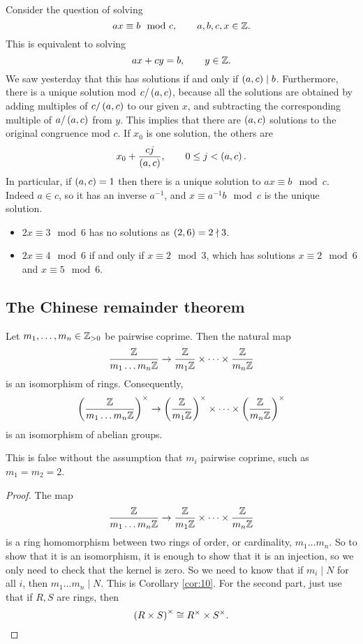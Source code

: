 Consider the question of solving
$$ ax \equiv b \mod c, \qquad a, b, c, x \in \mathbb{Z}. $$
This is equivalent to solving
$$ ax + cy = b, \qquad y \in \mathbb{Z}. $$
We saw yesterday that this has solutions if and only if $ \left( a, c \right) \mid b $. Furthermore, there is a unique solution mod $ c / \left( a, c \right) $, because all the solutions are obtained by adding multiples of $ c / \left( a, c \right) $ to our given $ x $, and subtracting the corresponding multiple of $ a / \left( a, c \right) $ from $ y $. This implies that there are $ \left( a, c \right) $ solutions to the original congruence mod $ c $. If $ x_0 $ is one solution, the others are
$$ x_0 + \dfrac{cj}{\left( a, c \right)}, \qquad 0 \le j < \left( a, c \right). $$
In particular, if $ \left( a, c \right) = 1 $ then there is a unique solution to $ ax \equiv b \mod c $. Indeed $ a \in \unit{c} $, so it has an inverse $ a^{-1} $, and $ x \equiv a^{-1}b \mod c $ is the unique solution.

\begin{example*}
\hfill
\begin{itemize}
\item $ 2x \equiv 3 \mod 6 $ has no solutions as $ \left( 2, 6 \right) = 2 \nmid 3 $.
\item $ 2x \equiv 4 \mod 6 $ if and only if $ x \equiv 2 \mod 3 $, which has solutions $ x \equiv 2 \mod 6 $ and $ x \equiv 5 \mod 6 $.
\end{itemize}
\end{example*}

\subsection{The Chinese remainder theorem}

\begin{theorem}
\label{thm:14}
Let $ m_1, \dots, m_n \in \mathbb{Z}_{> 0} $ be pairwise coprime. Then the natural map
$$ \dfrac{\mathbb{Z}}{m_1 \dots m_n\mathbb{Z}} \to \dfrac{\mathbb{Z}}{m_1\mathbb{Z}} \times \dots \times \dfrac{\mathbb{Z}}{m_n\mathbb{Z}} $$
is an isomorphism of rings. Consequently,
$$ \left( \dfrac{\mathbb{Z}}{m_1 \dots m_n\mathbb{Z}} \right)^\times \to \left( \dfrac{\mathbb{Z}}{m_1\mathbb{Z}} \right)^\times \times \dots \times \left( \dfrac{\mathbb{Z}}{m_n\mathbb{Z}} \right)^\times $$
is an isomorphism of abelian groups.
\end{theorem}

\begin{remark*}
This is false without the assumption that $ m_i $ pairwise coprime, such as $ m_1 = m_2 = 2 $.
\end{remark*}

\begin{proof}
The map
$$ \dfrac{\mathbb{Z}}{m_1 \dots m_n\mathbb{Z}} \to \dfrac{\mathbb{Z}}{m_1\mathbb{Z}} \times \dots \times \dfrac{\mathbb{Z}}{m_n\mathbb{Z}} $$
is a ring homomorphism between two rings of order, or cardinality, $ m_1 \dots m_n $. So to show that it is an isomorphism, it is enough to show that it is an injection, so we only need to check that the kernel is zero. So we need to know that if $ m_i \mid N $ for all $ i $, then $ m_1 \dots m_n \mid N $. This is Corollary \ref{cor:10}. For the second part, just use that if $ R, S $ are rings, then
$$ \left( R \times S \right)^\times \cong R^\times \times S^\times. $$
\end{proof}

